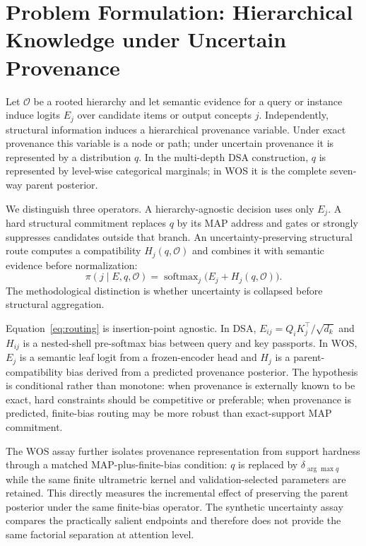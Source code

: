 \documentclass[preprint,11pt]{elsarticle}
\begin{document}
\section{Problem Formulation: Hierarchical Knowledge under Uncertain Provenance}
Let $\mathcal O$ be a rooted hierarchy and let semantic evidence for a query or instance induce logits $E_j$ over candidate items or output concepts $j$. Independently, structural information induces a hierarchical provenance variable. Under exact provenance this variable is a node or path; under uncertain provenance it is represented by a distribution $q$. In the multi-depth DSA construction, $q$ is represented by level-wise categorical marginals; in WOS it is the complete seven-way parent posterior.

We distinguish three operators. A hierarchy-agnostic decision uses only $E_j$. A hard structural commitment replaces $q$ by its MAP address and gates or strongly suppresses candidates outside that branch. An uncertainty-preserving structural route computes a compatibility $H_j(q,\mathcal O)$ and combines it with semantic evidence before normalization:
\begin{equation}
 \pi(j\mid E,q,\mathcal O)=\operatorname{softmax}_j\bigl(E_j+H_j(q,\mathcal O)\bigr).
 \label{eq:routing}
\end{equation}
The methodological distinction is whether uncertainty is collapsed before structural aggregation.

Equation~\eqref{eq:routing} is insertion-point agnostic. In DSA, $E_{ij}=Q_iK_j^\top/\sqrt{d_k}$ and $H_{ij}$ is a nested-shell pre-softmax bias between query and key passports. In WOS, $E_j$ is a semantic leaf logit from a frozen-encoder head and $H_j$ is a parent-compatibility bias derived from a predicted provenance posterior. The hypothesis is conditional rather than monotone: when provenance is externally known to be exact, hard constraints should be competitive or preferable; when provenance is predicted, finite-bias routing may be more robust than exact-support MAP commitment.

The WOS assay further isolates provenance representation from support hardness through a matched MAP-plus-finite-bias condition: $q$ is replaced by $\delta_{\arg\max q}$ while the same finite ultrametric kernel and validation-selected parameters are retained. This directly measures the incremental effect of preserving the parent posterior under the same finite-bias operator. The synthetic uncertainty assay compares the practically salient endpoints and therefore does not provide the same factorial separation at attention level.
\end{document}
